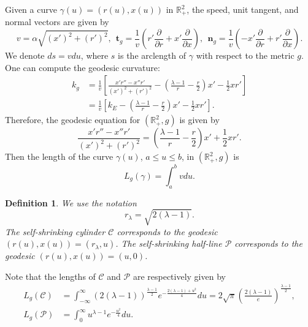 \documentclass{amsart}
\theoremstyle{Corollary}
\newtheorem{defn}[theorem]{Definition}
\numberwithin{equation}{section}
\begin{document}
Given a curve $\gamma(u)=(r(u),x(u))$ in $\mathbb{R}^2_+$,
the speed, unit tangent, and normal vectors
are given by
\begin{equation}\label{1.1}
v=\alpha\sqrt{(x')^2+(r')^2},~~
\mathbf{t}_g=\frac{1}{v}\left(r'\frac{\partial}{\partial r}+x'\frac{\partial}{\partial x}\right),~~
\mathbf{n}_g=\frac{1}{v}\left(-x'\frac{\partial}{\partial r}+r'\frac{\partial}{\partial x}\right).
\end{equation}
We denote $ds=vdu$, where $s$ is the arclength of $\gamma$ with respect
to the metric $g$. One can compute the geodesic curvature: 
\begin{equation}\label{1.2}
\begin{split}
   k_g &
=\frac{1}{v}\left[\frac{x'r''-x''r'}{(x')^2+(r')^2}-\left(\frac{\lambda-1}{r}-\frac{r}{2}\right)x'-\frac{1}{2}xr'\right]\\
&
=\frac{1}{v}\left[k_E-\left(\frac{\lambda-1}{r}-\frac{r}{2}\right)x'-\frac{1}{2}xr'\right].
\end{split}
\end{equation}
Therefore, the geodesic equation for $(\mathbb{R}^2_+,g)$ is given by
\begin{equation}\label{1.3}
\frac{x'r''-x''r'}{(x')^2+(r')^2}=\left(\frac{\lambda-1}{r}-\frac{r}{2}\right)x'+\frac{1}{2}xr'.
\end{equation}
Then the length of the curve $\gamma(u)$, $a\leq u\leq b$, in $(\mathbb{R}^2_+,g)$ is
\begin{equation}\label{1.4}
L_g(\gamma)=\int_a^bvdu.
\end{equation}

\begin{defn}
\emph{We use the notation
$$r_\lambda=\sqrt{2(\lambda-1)}.$$
The self-shrinking cylinder $\mathcal{C}$ corresponds to the geodesic
$(r(u),x(u))=(r_\lambda,u)$. The self-shrinking
half-line $\mathcal{P}$ corresponds to the geodesic
$(r(u),x(u))=(u,0)$.}
\end{defn}


Note that the lengths of $\mathcal{C}$ and $\mathcal{P}$ are respectively given by
\begin{equation}\label{1.5}
\begin{split}
L_g(\mathcal{C})&=\int_{-\infty}^\infty (2(\lambda-1))^{\frac{\lambda-1}{2}}e^{-\frac{2(\lambda-1)+u^2}{4}}du
=2\sqrt{\pi}\left(\frac{2(\lambda-1)}{e}\right)^{\frac{\lambda-1}{2}},\\
L_g(\mathcal{P})&=\int_0^\infty u^{\lambda-1} e^{-\frac{u^2}{4}}du.
\end{split}
\end{equation}
\end{document}
